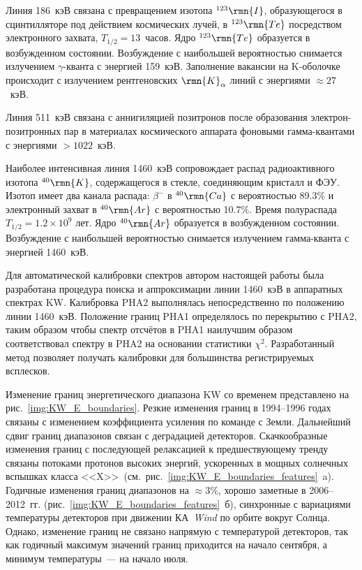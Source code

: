 Линия 186~кэВ связана с превращением изотопа $^{123}\rmn{I}$, образующегося в 
сцинтилляторе под действием космических лучей, в $^{123}\rmn{Te}$ посредством 
электронного захвата, $T_{1/2}=13$~часов. Ядро $^{123}\rmn{Te}$ образуется в 
возбужденном состоянии. Возбуждение с наибольшей вероятностью снимается излучением $\gamma$-кванта 
с энергией 159~кэВ. Заполнение вакансии на K-оболочке происходит с излучением 
рентгеновских $\rmn{K}_{\alpha}$ линий с энергиями $\approx 27$~кэВ.

Линия 511~кэВ связана с аннигиляцией позитронов после образования электрон-позитронных 
пар в материалах космического аппарата фоновыми гамма-квантами с энергиями $>1022$~кэВ.

Наиболее интенсивная линия 1460~кэВ сопровождает распад радиоактивного 
изотопа $^{40}\rmn{K}$, содержащегося в стекле, соединяющим кристалл и ФЭУ. 
Изотоп имеет два канала распада: $\beta^{-}$ в $^{40}\rmn{Ca}$ с 
вероятностью 89.3\% и электронный захват в $^{40}\rmn{Ar}$ с вероятностью 10.7\%. 
Время полураспада $T_{1/2}=1.2\times10^9$ лет. Ядро $^{40}\rmn{Ar}$ образуется в
возбужденном состоянии. Возбуждение с наибольшей вероятностью снимается 
излучением гамма-кванта с энергией 1460~кэВ.

Для автоматической калибровки спектров автором настоящей работы была 
разработана процедура поиска и аппроксимации линии 1460~кэВ в аппаратных спектрах 
KW. Калибровка PHA2 выполнялась непосредственно по положению 
линии 1460~кэВ. Положение границ PHA1 определялось по перекрытию с PHA2, 
таким образом чтобы спектр отсчётов в PHA1 наилучшим образом соответствовал спектру в PHA2 
на основании статистики $\chi^2$. Разработанный метод позволяет получать калибровки 
для большинства регистрируемых всплесков.

Изменение границ энергетического диапазона KW со временем представлено 
на рис.~\ref{img:KW_E_boundaries}. Резкие изменения границ в 1994--1996 годах 
связаны с изменением коэффициента усиления по команде с Земли. Дальнейший сдвиг 
границ диапазонов связан с деградацией детекторов. Скачкообразные изменения границ с последующей релаксацией 
к предшествующему тренду связаны потоками протонов высоких энергий, ускоренных в мощных 
солнечных вспышках класса <<X>>\ (см.~рис.~\ref{img:KW_E_boundaries_features}~a). 
Годичные изменения границ диапазонов на $\approx 3$\%, хорошо заметные в 2006--2012~гг. 
(рис.~\ref{img:KW_E_boundaries_features}~б), синхронные с вариациями температуры детекторов при движении 
КА~\textit{Wind} по орбите вокруг Солнца. Однако, изменение границ не связано напрямую 
с температурой детекторов, так как годичный максимум значений границ приходится на 
начало сентября, а минимум температуры~--- на начало июля. 

